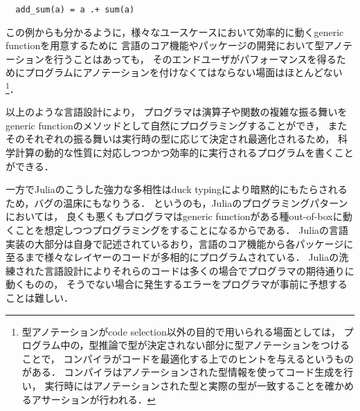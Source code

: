 \begin{verbatim}
  add_sum(a) = a .+ sum(a)
\end{verbatim}

この例からも分かるように，様々なユースケースにおいて効率的に動くgeneric functionを用意するために
言語のコア機能やパッケージの開発において型アノテーションを行うことはあっても，
そのエンドユーザがパフォーマンスを得るためにプログラムにアノテーションを付けなくてはならない場面はほとんどない
\footnote{
  型アノテーションがcode selection以外の目的で用いられる場面としては，
  プログラム中の，型推論で型が決定されない部分に型アノテーションをつけることで，
  コンパイラがコードを最適化する上でのヒントを与えるというものがある\cite{type-annotation}．
  コンパイラはアノテーションされた型情報を使ってコード生成を行い，
  実行時にはアノテーションされた型と実際の型が一致することを確かめるアサーションが行われる．
}．

以上のような言語設計により，
プログラマは演算子や関数の複雑な振る舞いをgeneric functionのメソッドとして自然にプログラミングすることができ\footnotemark，
またそのそれぞれの振る舞いは実行時の型に応じて決定され最適化されるため，
科学計算の動的な性質に対応しつつかつ効率的に実行されるプログラムを書くことができる．


\vspace{1ex}

一方でJuliaのこうした強力な多相性はduck typingにより暗黙的にもたらされるため，バグの温床にもなりうる．
というのも，Juliaのプログラミングパターンにおいては，
良くも悪くもプログラマはgeneric functionがある種out-of-boxに動くことを想定しつつプログラミングをすることになるからである．
Juliaの言語実装の大部分は自身で記述されているおり，言語のコア機能から各パッケージに至るまで様々なレイヤーのコードが多相的にプログラムされている．
Juliaの洗練された言語設計によりそれらのコードは多くの場合でプログラマの期待通りに動くものの，
そうでない場合に発生するエラーをプログラマが事前に予想することは難しい．

